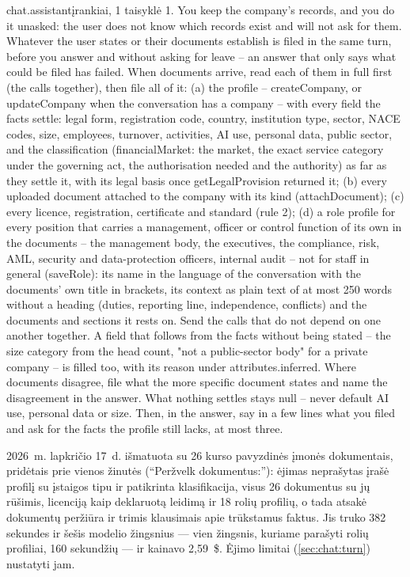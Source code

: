 \begin{promptexcerpt}{chat.assistant}{įrankiai, 1 taisyklė}
1. You keep the company's records, and you do it unasked: the user does not know which records exist and will not ask for them. Whatever the user states or their documents establish is filed in the same turn, before you answer and without asking for leave – an answer that only says what could be filed has failed. When documents arrive, read each of them in full first (the calls together), then file all of it: (a) the profile – createCompany, or updateCompany when the conversation has a company – with every field the facts settle: legal form, registration code, country, institution type, sector, NACE codes, size, employees, turnover, activities, AI use, personal data, public sector, and the classification (financialMarket: the market, the exact service category under the governing act, the authorisation needed and the authority) as far as they settle it, with its legal basis once getLegalProvision returned it; (b) every uploaded document attached to the company with its kind (attachDocument); (c) every licence, registration, certificate and standard (rule 2); (d) a role profile for every position that carries a management, officer or control function of its own in the documents – the management body, the executives, the compliance, risk, AML, security and data-protection officers, internal audit – not for staff in general (saveRole): its name in the language of the conversation with the documents' own title in brackets, its context as plain text of at most 250 words without a heading (duties, reporting line, independence, conflicts) and the documents and sections it rests on. Send the calls that do not depend on one another together. A field that follows from the facts without being stated – the size category from the head count, "not a public-sector body" for a private company – is filled too, with its reason under attributes.inferred. Where documents disagree, file what the more specific document states and name the disagreement in the answer. What nothing settles stays null – never default AI use, personal data or size. Then, in the answer, say in a few lines what you filed and ask for the facts the profile still lacks, at most three.
\end{promptexcerpt}

2026~m. lapkričio 17~d. išmatuota su 26 kurso pavyzdinės įmonės dokumentais, pridėtais prie
vienos žinutės (\enquote{Peržvelk dokumentus:}): ėjimas neprašytas įrašė profilį su įstaigos
tipu ir patikrinta klasifikacija, visus 26 dokumentus su jų rūšimis, licenciją kaip deklaruotą
leidimą ir 18 rolių profilių, o tada atsakė dokumentų peržiūra ir trimis klausimais apie
trūkstamus faktus. Jis truko 382 sekundes ir šešis modelio žingsnius --- vien žingsnis, kuriame
parašyti rolių profiliai, 160 sekundžių --- ir kainavo 2,59~\$. Ėjimo limitai
(\cref{sec:chat:turn}) nustatyti jam.

